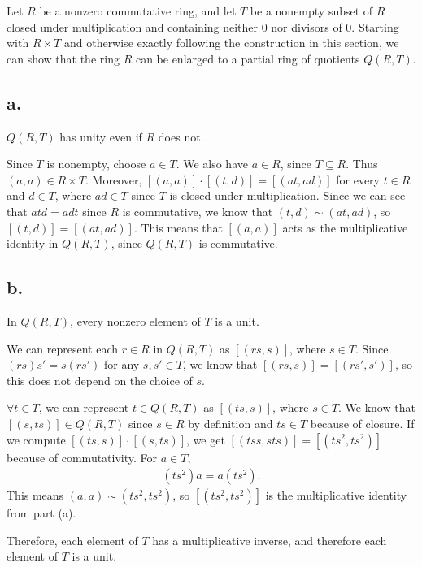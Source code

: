 \documentclass[11pt]{article}
\begin{document}
\begin{problem}[21.12]
Let $R$ be a nonzero commutative ring, and let $T$ be a nonempty subset of $R$ closed under multiplication and containing neither $0$ nor divisors of $0$. Starting with $R \times T$ and otherwise exactly following the construction in this section, we can show that the ring $R$ can be enlarged to a partial ring of quotients $Q(R,T)$.

\subsection*{a.}
$Q(R,T)$ has unity even if $R$ does not.

\begin{solution}
Since $T$ is nonempty, choose $a \in T$. We also have $a \in R$, since $T \subseteq R$. Thus $(a,a) \in R \times T$. Moreover, $[(a,a)] \cdot [(t,d)] = [(at,ad)]$ for every $t \in R$ and $d \in T$, where $ad \in T$ since $T$ is closed under multiplication.
Since we can see that $atd = adt$ since $R$ is commutative, we know that $(t,d) \sim (at,ad)$, so $[(t,d)] = [(at,ad)]$.
This means that $[(a,a)]$ acts as the multiplicative identity in $Q(R,T)$, since $Q(R,T)$ is commutative.
\end{solution}

\subsection*{b.}
In $Q(R,T)$, every nonzero element of $T$ is a unit.

\begin{solution}
We can represent each $r \in R$ in $Q(R,T)$ as $[(rs,s)]$, where $s \in T$. Since $(rs)s' = s(rs')$ for any $s,s' \in T$, we know that $[(rs,s)] = [(rs',s')]$, so this does not depend on the choice of $s$.

$\forall t \in T$, we can represent $t \in Q(R,T)$ as $[(ts,s)]$, where $s \in T$. We know that $[(s,ts)] \in Q(R,T)$ since $s \in R$ by definition and $ts \in T$ because of closure.
If we compute $[(ts,s)] \cdot [(s,ts)]$, we get $[(tss, sts)] = [(ts^2, ts^2)]$ because of commutativity. For $a \in T$,
\begin{align*}
    (ts^2)a = a(ts^2).
\end{align*}
This means $(a,a) \sim (ts^2, ts^2)$, so $[(ts^2,ts^2)]$ is the multiplicative identity from part (a).

Therefore, each element of $T$ has a multiplicative inverse, and therefore each element of $T$ is a unit.
\end{solution}
\end{problem}
\end{document}
